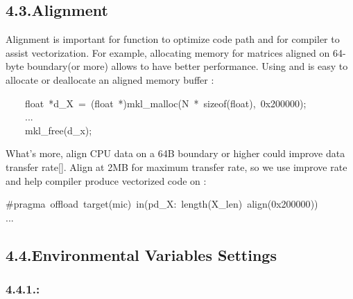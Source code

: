 \documentclass{article}
\begin{document}
\subsection{4.3.\hspace*{0.5em}Alignment}\label{sec-alignment}%

\noindent{}Alignment is important for  function to optimize code path and for compiler to assist vectorization. For example, allocating memory for matrices aligned on 64-byte boundary(or more) allows  to have better performance. Using  and  is easy to allocate or deallocate an aligned  memory buffer :%
\begin{mdpre}%
\noindent~~~~{float}~*d\_X~=~({float}~*)mkl\_malloc({N}~*~sizeof({float}),~{0x200000});\\
~~~~...\\
~~~~mkl\_free(d\_x);%
\end{mdpre}\noindent{}What's more, align CPU data on a 64B boundary or higher could improve data transfer rate[]. Align at 2MB for maximum transfer rate, so we use  improve rate and help compiler produce vectorized code on :
\begin{mdpre}%
\noindent\#pragma~offload~target(mic)~in(pd\_X:~length({X\_len})~align({0x200000}))\\
...%
\end{mdpre}
\subsection{4.4.\hspace*{0.5em}Environmental Variables Settings}\label{sec-environmental-variables-settings}%

\subsubsection{4.4.1.\hspace*{0.5em}:}\label{sec-mkl_dynamictrue-}%
\end{document}
